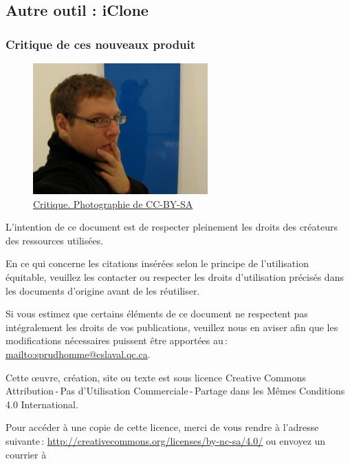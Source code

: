 \subsection{Autre outil : iClone} 
		\begin{frame}[allowframebreaks]
			\frametitle{Critique de ces nouveaux produit}
			
			\begin{figure}
			\centering
                     \includegraphics[width = 0.6\textwidth]{critique.png}
                     \caption{\tiny{\href{run:critique.png}{Critique. Photographie de \citet{Mosler2007} CC-BY-SA}}}
                   \end{figure}
			\framebreak
																														\end{frame}		
																												
\framebreak
\par L’intention de ce document est de respecter pleinement les droits des créateurs des ressources
utilisées.
	\par En ce qui concerne les citations insérées selon le principe de l'utilisation équitable, veuillez les contacter ou respecter les droits d’utilisation précisés dans les documents d’origine avant de les réutiliser.
	\par Si vous estimez que certains éléments de ce document ne respectent pas intégralement les droits de vos
publications, veuillez nous en aviser afin que les modifications nécessaires puissent être apportées au\,: \url{mailto:sprudhomme@cslaval.qc.ca}.
	\par Cette \oe uvre, création, site ou texte est sous licence Creative Commons Attribution\,-\,Pas d’Utilisation Commerciale\,-\,Partage dans les Mêmes Conditions 4.0 International. \\
	\par 
	 Pour accéder à une copie de cette licence, merci de vous rendre à l'adresse suivante\,: \url{http://creativecommons.org/licenses/by-nc-sa/4.0/} ou envoyez un courrier à 

